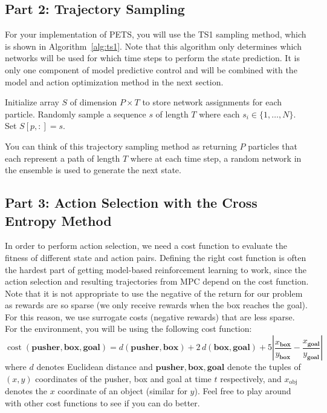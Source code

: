 \documentclass[11pt]{article}
\begin{document}
\subsection*{Part 2: Trajectory Sampling}
For your implementation of PETS, you will use the TS1 sampling method, which is shown in Algorithm~\ref{alg:ts1}. Note that this algorithm only determines which networks will be used for which time steps to perform the state prediction. It is only one component of model predictive control and will be combined with the model and action optimization method in the next section.

\begin{algorithm}[H]
\caption{Trajectory Sampling with TS1}\label{alg:ts1}
\begin{algorithmic}[1]
  \State Initialize array $S$ of dimension $P \times T$ to store network assignments for each particle.
    \State Randomly sample a sequence $s$ of length $T$ where each $s_i \in \{1, \ldots, N\}$.
    \State Set $S[p, :] = s$.
  \EndFor
\EndProcedure
\end{algorithmic}
\end{algorithm}

You can think of this trajectory sampling method as returning $P$ particles that each represent a path of length $T$ where at each time step, a random network in the ensemble is used to generate the next state.

\subsection*{Part 3: Action Selection with the Cross Entropy Method}
In order to perform action selection, we need a cost function to evaluate the fitness of different state and action pairs. Defining the right cost function is often the hardest part of getting model-based reinforcement learning to work, since the action selection and resulting trajectories from MPC depend on the cost function. Note that it is not appropriate to use the negative of the return for our problem as rewards are so sparse (we only receive rewards when the box reaches the goal). For this reason, we use surrogate costs (negative rewards) that are less sparse. For the  environment, you will be using the following cost function:
\begin{equation}
  \operatorname{cost}(\mathbf{pusher}, \mathbf{box}, \mathbf{goal}) = d(\mathbf{pusher}, \mathbf{box}) + 2\,d(\mathbf{box}, \mathbf{goal}) + 5\left|\frac{x_\mathbf{box}}{y_\mathbf{box}} - \frac{x_\mathbf{goal}}{y_\mathbf{goal}}\right|
\end{equation}
where $d$ denotes Euclidean distance and $\mathbf{pusher}, \mathbf{box}, \mathbf{goal}$ denote the tuples of $(x, y)$ coordinates of the pusher, box and goal at time $t$ respectively, and $x_\text{obj}$ denotes the $x$ coordinate of an object (similar for $y$). Feel free to play around with other cost functions to see if you can do better.
\end{document}
